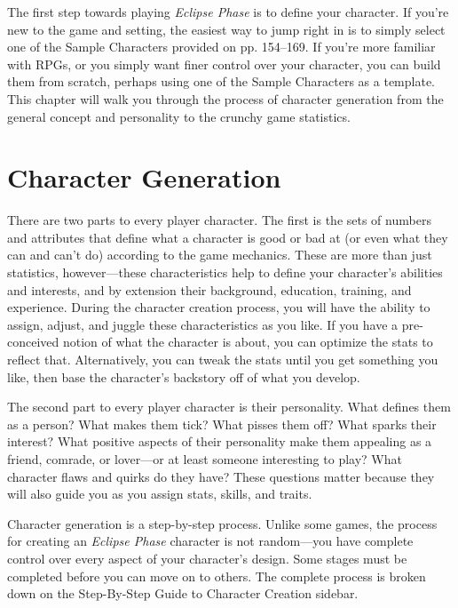 The first step towards playing \textit{Eclipse Phase }is to 
define your character. If you're new to the game and 
setting, the easiest way to jump right in is to simply 
select one of the Sample Characters provided on pp. 
154–169. If you're more familiar with RPGs, or you 
simply want finer control over your character, you 
can build them from scratch, perhaps using one of the 
Sample Characters as a template. This chapter will 
walk you through the process of character generation
from the general concept and personality to the
crunchy game statistics.

\section{Character Generation}

There are two parts to every player character. The 
first is the sets of numbers and attributes that define 
what a character is good or bad at (or even what they 
can and can't do) according to the game mechanics. 
These are more than just statistics, however—these 
characteristics help to define your character's abilities
and interests, and by extension their background,
education, training, and experience. During the 
character creation process, you will have the ability 
to assign, adjust, and juggle these characteristics as 
you like. If you have a pre-conceived notion of what 
the character is about, you can optimize the stats to 
reflect that. Alternatively, you can tweak the stats until 
you get something you like, then base the character's 
backstory off of what you develop.

The second part to every player character is their 
personality. What defines them as a person? What 
makes them tick? What pisses them off? What sparks 
their interest? What positive aspects of their personality
make them appealing as a friend, comrade, or
lover—or at least someone interesting to play? What 
character flaws and quirks do they have? These questions
matter because they will also guide you as you
assign stats, skills, and traits.

Character generation is a step-by-step process. 
Unlike some games, the process for creating an 
\textit{Eclipse Phase} character is not random—you have 
complete control over every aspect of your character's
design. Some stages must be completed before
you can move on to others. The complete process is 
broken down on the Step-By-Step Guide to Character 
Creation sidebar.

